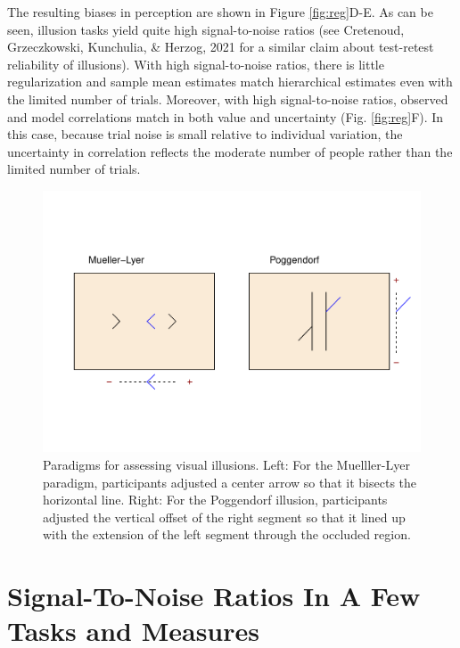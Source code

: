 \documentclass[
  ,man]{apa6}
\begin{document}
The resulting biases in perception are shown in Figure \ref{fig:reg}D-E. As can be seen, illusion tasks yield quite high signal-to-noise ratios (see Cretenoud, Grzeczkowski, Kunchulia, \& Herzog, 2021 for a similar claim about test-retest reliability of illusions). With high signal-to-noise ratios, there is little regularization and sample mean estimates match hierarchical estimates even with the limited number of trials. Moreover, with high signal-to-noise ratios, observed and model correlations match in both value and uncertainty (Fig. \ref{fig:reg}F). In this case, because trial noise is small relative to individual variation, the uncertainty in correlation reflects the moderate number of people rather than the limited number of trials.

\begin{figure}
\centering
\includegraphics{p_files/figure-latex/ill-1.pdf}
\caption{\label{fig:ill}Paradigms for assessing visual illusions. Left: For the Muelller-Lyer paradigm, participants adjusted a center arrow so that it bisects the horizontal line. Right: For the Poggendorf illusion, participants adjusted the vertical offset of the right segment so that it lined up with the extension of the left segment through the occluded region.}
\end{figure}

\hypertarget{signal-to-noise-ratios-in-a-few-tasks-and-measures}{%
\section{Signal-To-Noise Ratios In A Few Tasks and Measures}\label{signal-to-noise-ratios-in-a-few-tasks-and-measures}}
\end{document}
